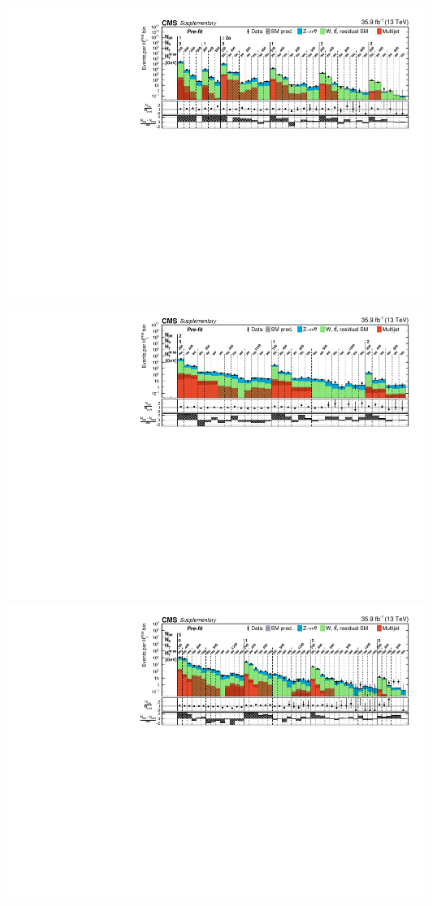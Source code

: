 \begin{figure}
    \begin{center}
            \includegraphics[width=0.98\textwidth]{Supplementary/FullBinning_results_monojet_no-fit_aux}
            \includegraphics[width=0.98\textwidth]{Supplementary/FullBinning_results_2jet_no-fit_aux}\\
            \includegraphics[width=0.98\textwidth]{Supplementary/FullBinning_results_3jet_no-fit_aux}\\

\end{center}
\end{figure}
